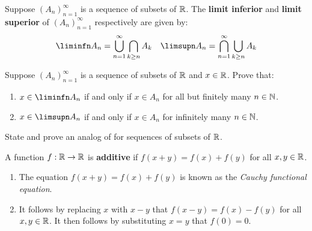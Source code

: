 \documentclass{article}
\begin{document}
\begin{definition}
    Suppose $(A_n)_{n=1}^\infty$ is a sequence of subsets of $\R$. The \textbf{limit inferior} and \textbf{limit superior} of $(A_n)_{n=1}^\infty$ respectively are given by:
    \begin{align*}
        \liminfn A_n = \cuppn \capp_{k\ge n} A_k && \limsupn A_n = \cappn \cupp_{k\ge n} A_k
    \end{align*}
\end{definition}

\begin{exercise}
    Suppose $(A_n)_{n=1}^\infty$ is a sequence of subsets of $\R$ and $x\in\R$. Prove that:
    \begin{enumerate}
        \item $x\in\liminfn A_n$ if and only if $x\in A_n$ for all but finitely many $n\in\N$.
        \item $x\in\limsupn A_n$ if and only if $x\in A_n$ for infinitely many $n\in\N$.
    \end{enumerate}
\end{exercise}

\begin{exercise}
    State and prove an analog of  for sequences of subsets of $\R$.
\end{exercise}

\begin{definition}
    A function $f:\R\to\R$ is \textbf{additive} if $f(x+y)=f(x)+f(y)$ for all $x,y\in\R$.
\end{definition}
\begin{remarks}\leavevmode
    \begin{enumerate}
        \item The equation $f(x+y)=f(x)+f(y)$ is known as the \textit{Cauchy functional equation}.
        \item It follows by replacing $x$ with $x-y$ that $f(x-y)=f(x)-f(y)$ for all $x,y\in\R$. It then follows by substituting $x=y$ that $f(0)=0$.
    \end{enumerate}
\end{remarks}
\end{document}
